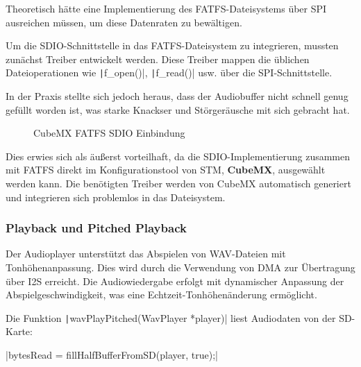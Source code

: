 Theoretisch hätte eine Implementierung des FATFS-Dateisystems über SPI ausreichen müssen, um diese Datenraten zu bewältigen. 

Um die SDIO-Schnittstelle in das FATFS-Dateisystem zu integrieren, mussten zunächst Treiber entwickelt werden. Diese Treiber mappen die üblichen Dateioperationen wie \texttt|f_open()|, \texttt|f_read()| usw. über die SPI-Schnittstelle.


In der Praxis stellte sich jedoch heraus, dass der Audiobuffer nicht schnell genug gefüllt worden ist, was starke Knackser und Störgeräusche mit sich gebracht hat.

\begin{figure} %
	\vspace{-20pt}
	\caption{CubeMX FATFS SDIO Einbindung}
	\label{fig:cubemx_sdio}
\end{figure}

Dies erwies sich als äußerst vorteilhaft, da die SDIO-Implementierung zusammen mit FATFS direkt im Konfigurationstool von STM, \textbf{CubeMX}, ausgewählt werden kann. Die benötigten Treiber werden von CubeMX automatisch generiert und integrieren sich problemlos in das Dateisystem.

\subsubsection{Playback und Pitched Playback}

Der Audioplayer unterstützt das Abspielen von WAV-Dateien mit Tonhöhenanpassung. Dies wird durch die Verwendung von DMA zur Übertragung über I2S erreicht. Die Audiowiedergabe erfolgt mit dynamischer Anpassung der Abspielgeschwindigkeit, was eine Echtzeit-Tonhöhenänderung ermöglicht.

Die Funktion \texttt|wavPlayPitched(WavPlayer *player)| liest Audiodaten von der SD-Karte:

|bytesRead = fillHalfBufferFromSD(player, true);|

